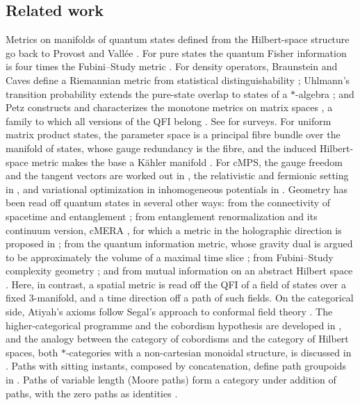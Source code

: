 \documentclass[11pt,a4paper,reqno]{amsart}
\theoremstyle{definition}
\numberwithin{equation}{section}
\begin{document}
\subsection*{Related work}
Metrics on manifolds of quantum states defined from the Hilbert-space structure go back to Provost and Vall\'ee \cite{provost1980}. For pure states the quantum Fisher information is four times the Fubini--Study metric \cite[Thm.~2.5 and Sec.~2.4.1]{liu2020qfi}. For density operators, Braunstein and Caves define a Riemannian metric from statistical distinguishability \cite{braunstein1994}; Uhlmann's transition probability extends the pure-state overlap to states of a $*$-algebra \cite{uhlmann1976}; and Petz constructs and characterizes the monotone metrics on matrix spaces \cite{petz1996}, a family to which all versions of the QFI belong \cite[Sec.~2.1]{liu2020qfi}. See \cite{amari2000,liu2020qfi} for surveys. For uniform matrix product states, the parameter space is a principal fibre bundle over the manifold of states, whose gauge redundancy is the fibre, and the induced Hilbert-space metric makes the base a K\"ahler manifold \cite{haegeman2014geometry}. For cMPS, the gauge freedom and the tangent vectors are worked out in \cite{haegeman2013calculus}, the relativistic and fermionic setting in \cite{haegeman2010variational}, and variational optimization in inhomogeneous potentials in \cite{tuybens2022}. Geometry has been read off quantum states in several other ways: from the connectivity of spacetime and entanglement \cite{vanraamsdonk2010}; from entanglement renormalization \cite{swingle2012} and its continuum version, cMERA \cite{haegeman2013cmera}, for which a metric in the holographic direction is proposed in \cite{nozaki2012}; from the quantum information metric, whose gravity dual is argued to be approximately the volume of a maximal time slice \cite{miyaji2015}; from Fubini--Study complexity geometry \cite{erdmenger2023}; and from mutual information on an abstract Hilbert space \cite{cao2017}. Here, in contrast, a spatial metric is read off the QFI of a field of states over a fixed 3-manifold, and a time direction off a path of such fields. On the categorical side, Atiyah's axioms \cite{atiyah1988topological} follow Segal's approach to conformal field theory \cite{segal2004}. The higher-categorical programme and the cobordism hypothesis are developed in \cite{baezdolan1995,lurie2009}, and the analogy between the category of cobordisms and the category of Hilbert spaces, both $*$-categories with a non-cartesian monoidal structure, is discussed in \cite{baez2006quandaries}. Paths with sitting instants, composed by concatenation, define path groupoids in \cite[Def.~2.1]{schreiber2009}. Paths of variable length (Moore paths) form a category under addition of paths, with the zero paths as identities \cite[Sec.~6.1, Ex.~1]{brown2006}.
\end{document}
